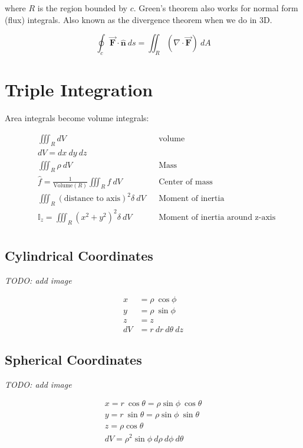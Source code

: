 \documentclass{article}
\newcommand{\bm}[1]{\mathbf{#1}}
\newcommand{\vf}[1]{\vec{\mathbf{#1}}}
\newcommand{\norm}{\hat{\bm{n}}}
\begin{document}
where $R$ is the region bounded by $c$.
\vskip 0.1in
Green's theorem also works for normal form (flux) integrals. Also known as the divergence theorem when we do in 3D.

\begin{equation}
    \oint_c \vf{F} \cdot \norm\ ds = \iint_R (\nabla \cdot \vf{F})\ dA
\end{equation}

\section{Triple Integration}
Area integrals become volume integrals:

\begin{align*}
    &\iiint_R dV && \text{volume} \\
    &dV = dx\ dy\ dz \\
    &\iiint_R \rho\ dV && \text{Mass} \\
    &\hat{f} = \frac{1}{\text{Volume}(R)}
        \iiint_R f\ dV && \text{Center of mass} \\
    &\iiint_R (\text{distance to axis})^2\delta\ dV
        && \text{Moment of inertia} \\
    &\mathbb{I}_z = \iiint_R (x^2 + y^2)^2\delta\ dV
        && \text{Moment of inertia around z-axis} \\
\end{align*}

\subsection{Cylindrical Coordinates}
\textit{TODO: add image}

\begin{align*}
    x &= \rho\ \cos \phi \\
    y &= \rho\ \sin \phi \\
    z &= z \\
    dV &= r\ dr\ d\theta\ dz
\end{align*}

\subsection{Spherical Coordinates}
\textit{TODO: add image}

\begin{align*}
    x = r\ \cos\theta = \rho \sin\phi\ \cos\theta\\
    y = r\ \sin\theta = \rho \sin\phi\ \sin\theta\\
    z = \rho \cos\theta \\
    dV = \rho^2 \sin\phi\ d\rho\ d\phi\ d\theta
\end{align*}
\end{document}
